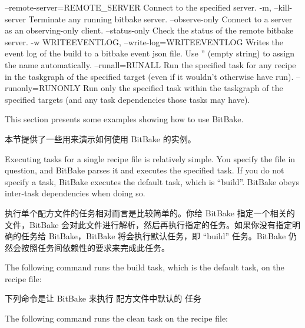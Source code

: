 \begin{pyglist}
  --remote-server=REMOTE_SERVER
                        Connect to the specified server.
  -m, --kill-server     Terminate any running bitbake server.
  --observe-only        Connect to a server as an observing-only client.
  --status-only         Check the status of the remote bitbake server.
  -w WRITEEVENTLOG, --write-log=WRITEEVENTLOG
                        Writes the event log of the build to a bitbake event
                        json file. Use '' (empty string) to assign the name
                        automatically.
  --runall=RUNALL       Run the specified task for any recipe in the taskgraph
                        of the specified target (even if it wouldn't otherwise
                        have run).
  --runonly=RUNONLY     Run only the specified task within the taskgraph of
                        the specified targets (and any task dependencies those
                        tasks may have).
\end{pyglist}


This section presents some examples showing how to use BitBake.

本节提供了一些用来演示如何使用 BitBake 的实例。


Executing tasks for a single recipe file is relatively simple. You specify the file in question, and BitBake parses it and executes the specified task. If you do not specify a task, BitBake executes the default task, which is ``build''. BitBake obeys inter-task dependencies when doing so.

执行单个配方文件的任务相对而言是比较简单的。你给 BitBake 指定一个相关的文件，BitBake 会对此文件进行解析，然后再执行指定的任务。如果你没有指定明确的任务给 BitBake，BitBake 将会执行默认任务，即 ``build'' 任务。BitBake 仍然会按照任务间依赖性的要求来完成此任务。

The following command runs the build task, which is the default task, on the  recipe file:

下列命令是让 BitBake 来执行  配方文件中默认的  任务


The following command runs the clean task on the  recipe file:

